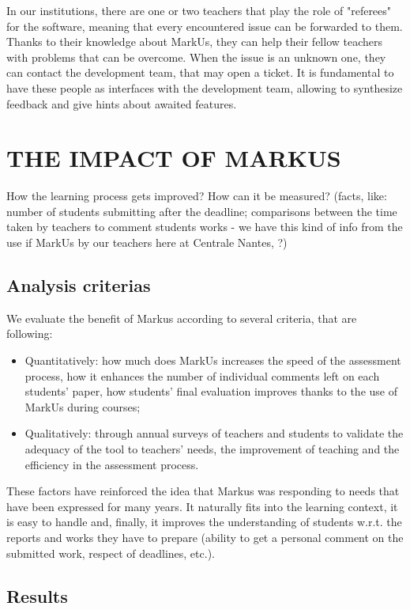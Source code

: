 \documentclass[twocolumn,10pt]{asme2e}
\begin{document}
In our institutions, there are one or two teachers that play the role of "referees" for the software, meaning that every encountered issue can be forwarded to them. Thanks to their knowledge about MarkUs, they can help their fellow teachers with problems that can be overcome. When the issue is an unknown one, they can contact the development team, that may open a ticket. It is fundamental to have these people as interfaces with the development team, allowing to synthesize feedback and give hints about awaited features. 

\section*{THE IMPACT OF MARKUS}

How the learning process gets improved? How can it be measured? (facts, like: number of students submitting after the deadline; comparisons between the time taken by teachers to comment students works - we have this kind of info from the use if MarkUs by our teachers here at Centrale Nantes, ?)

\subsection*{Analysis criterias}

We evaluate the benefit of Markus according to several criteria, that are following: 
\begin{itemize}
\item Quantitatively: how much does MarkUs increases the speed of the assessment process, how it enhances the number of individual comments left on each students' paper, how students' final evaluation improves thanks to the use of MarkUs during courses;
\item Qualitatively: through annual surveys of teachers and students to validate the adequacy of the tool to teachers' needs, the improvement of teaching and the efficiency in the assessment process.
\end{itemize}
These factors have reinforced the idea that Markus was responding to needs that have been expressed for many years. It naturally fits into the learning context, it is easy to handle and, finally, it improves the understanding of students w.r.t. the reports and works they have to prepare (ability to get a personal comment on the submitted work, respect of deadlines, etc.).

\subsection*{Results}
\end{document}
